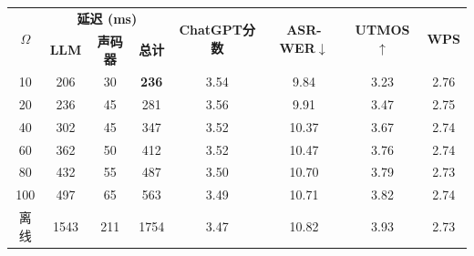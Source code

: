 \begin{table}[t]
    \label{tab:llamaomni_streaming}
    \centering
    \small
    \begin{tabular}{cccccccc}
        \toprule
        \multirow{2}{*}{\textbf{$\Omega$}} & \multicolumn{3}{c}{\textbf{延迟 (ms)}} & \multirow{2}{*}{\textbf{ChatGPT分数}} & \multirow{2}{*}{\textbf{ASR-WER$\downarrow$}} & \multirow{2}{*}{\textbf{UTMOS$\uparrow$}} & \multirow{2}{*}{\textbf{WPS}} \\
        & \textbf{LLM} & \textbf{声码器} & \textbf{总计} & & & & \\
        \midrule
        10 & 206 & 30 & \textbf{236} & 3.54 & 9.84 & 3.23 & 2.76 \\
        20 & 236 & 45 & 281 & 3.56 & 9.91 & 3.47 & 2.75 \\
        40 & 302 & 45 & 347 & 3.52 & 10.37 & 3.67 & 2.74 \\
        60 & 362 & 50 & 412 & 3.52 & 10.47 & 3.76 & 2.74 \\
        80 & 432 & 55 & 487 & 3.50 & 10.70 & 3.79 & 2.73 \\
        100 & 497 & 65 & 563 & 3.49 & 10.71 & 3.82 & 2.74 \\
        离线 & 1543 & 211 & 1754 & 3.47 & 10.82 & 3.93 & 2.73 \\
        \bottomrule
    \end{tabular}
\end{table}

